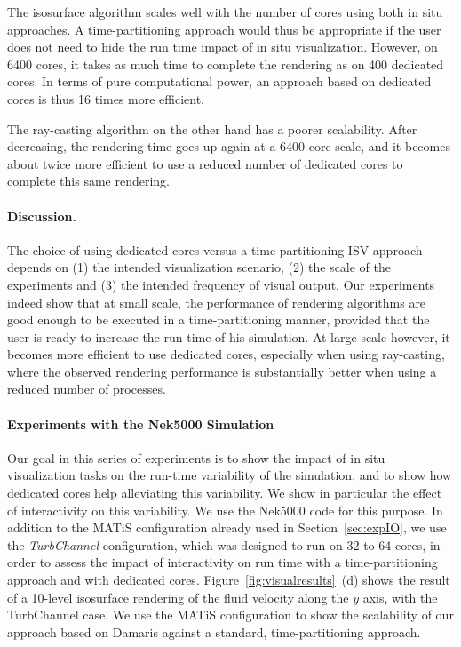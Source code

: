 The isosurface algorithm scales well with the number of cores 
using both in situ approaches. A time-partitioning approach would thus be 
appropriate if the user does not need to hide the run time impact of in situ 
visualization.
However, on 6400 cores, it takes as much time 
to complete the rendering as on 400 dedicated cores. In
terms of pure computational power, an approach based on dedicated cores is thus 16 
times more efficient.

The ray-casting algorithm on the other hand has a poorer scalability. After 
decreasing, the rendering time goes up again at a 6400-core scale, and it 
becomes about twice more efficient to use a reduced number of dedicated 
cores to complete this same rendering.

\paragraph{Discussion.} The choice of using dedicated cores versus a time-partitioning ISV approach 
depends on (1) the intended visualization scenario, (2) the scale of the experiments and 
(3) the intended frequency of visual output. Our experiments indeed show that at small scale,
the performance of rendering algorithms are good enough to be executed in a time-partitioning manner,
provided that the user is ready to increase the run time of his simulation. At large scale however,
it becomes more efficient to use dedicated cores, especially when using ray-casting,
where the observed rendering performance is substantially better when using a reduced number of
processes.


\paragraph{Experiments with the Nek5000 Simulation}
Our goal in this series of experiments is to show the impact of in situ visualization
tasks on the run-time variability of the simulation, and to show how dedicated cores
help alleviating this variability. We show in particular the effect of 
interactivity on this variability. We use the Nek5000 code for this purpose.
In addition to the MATiS configuration already used in Section~\ref{sec:expIO}, we
use the \emph{TurbChannel} configuration, which was designed to run on 32 to 64 cores,
in order to assess the impact of 
interactivity on run time with a time-partitioning approach and with dedicated cores. 
Figure~\ref{fig:visualresults}~(d) shows the result of a 10-level 
isosurface rendering of the fluid velocity along the $y$ axis, with the 
TurbChannel case. We use the MATiS configuration to show the scalability of our 
approach based on Damaris against a standard, time-partitioning approach.


